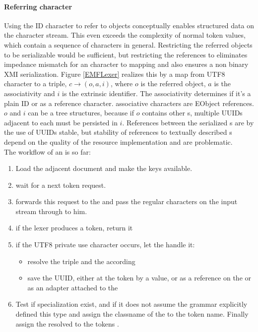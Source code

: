 \paragraph{Referring character} \label{RefEObj} Using the ID character to refer to objects conceptually enables structured data on the character stream. This even exceeds the complexity of normal token values, which contain a sequence of characters in general. Restricting the referred objects to be serializable would be sufficient, but restricting the references to  eliminates impedance mismatch for an character to  mapping and also ensures a non binary XMI serialization. Figure \ref{EMFLexer} realizes this by a map from UTF8 character to a triple, $c \rightarrow (o,a,i)$, where $o$ is the referred object, $a$ is the associativity and $i$ is the extrinsic identifier. The associativity determines if it's a plain ID or as a reference character.  associative characters are EObject references. $o$ and $i$ can be a tree structures, because if $o$ contains other s, multiple UUIDs adjacent to each  must be persisted in $i$. References between the serialized s are by the use of UUIDs stable, but stability of references to textually described s depend on the quality of the resource implementation and are problematic. \\
The workflow of an  is so far:
\begin{enumerate}
	\item Load the adjacent document and make the keys available.
	\item wait for a next token request.
	\item forwards this request to the  and pass the regular characters on the input stream through to him.
	\item if the lexer produces a token, return it
	\item if the UTF8 private use character occurs, let the  handle it:
		\begin{itemize}
			\item resolve the triple and the according 
			\item save the UUID, either at the token by a value, or as a reference on the  or as an adapter attached to the  
		\end{itemize} 
	\item Test if specialization  exist, and if it does not assume the grammar explicitly defined this type and assign the classname of the  to the token name. Finally assign the resolved  to the tokens .
\end{enumerate}

